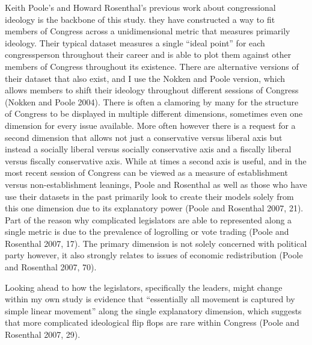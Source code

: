 \documentclass[12pt,twoside]{reedthesis}
\begin{document}
  Keith Poole's and Howard Rosenthal's previous work about congressional
  ideology is the backbone of this study. they have constructed a way to
  fit members of Congress across a unidimensional metric that measures
  primarily ideology. Their typical dataset measures a single ``ideal
  point'' for each congressperson throughout their career and is able to
  plot them against other members of Congress throughout its existence.
  There are alternative versions of their dataset that also exist, and I
  use the Nokken and Poole version, which allows members to shift their
  ideology throughout different sessions of Congress (Nokken and Poole
  2004). There is often a clamoring by many for the structure of Congress
  to be displayed in multiple different dimensions, sometimes even one
  dimension for every issue available. More often however there is a
  request for a second dimension that allows not just a conservative
  versus liberal axis but instead a socially liberal versus socially
  conservative axis and a fiscally liberal versus fiscally conservative
  axis. While at times a second axis is useful, and in the most recent
  session of Congress can be viewed as a measure of establishment versus
  non-establishment leanings, Poole and Rosenthal as well as those who
  have use their datasets in the past primarily look to create their
  models solely from this one dimension due to its explanatory power
  (Poole and Rosenthal 2007, 21). Part of the reason why complicated
  legislators are able to represented along a single metric is due to the
  prevalence of logrolling or vote trading (Poole and Rosenthal 2007, 17).
  The primary dimension is not solely concerned with political party
  however, it also strongly relates to issues of economic redistribution
  (Poole and Rosenthal 2007, 70).
  
  Looking ahead to how the legislators, specifically the leaders, might
  change within my own study is evidence that ``essentially all movement
  is captured by simple linear movement'' along the single explanatory
  dimension, which suggests that more complicated ideological flip flops
  are rare within Congress (Poole and Rosenthal 2007, 29).
  
\end{document}
